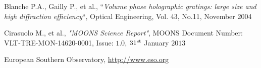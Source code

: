\begin{thebibliography}{17}

Blanche P.A., Gailly P., et al., “\textit{Volume phase holographic gratings: large size and high diffraction efficiency}“, Optical Engineering, Vol. 43, No.11, November 2004

Cirasuolo M., et al., \textit{"MOONS Science Report"}, MOONS Document Number: VLT-TRE-MON-14620-0001, Issue: $1.0$, $31^{\textup{st}}$ January $2013$

European Southern Observatory, \url{http://www.eso.org}


\end{thebibliography}
